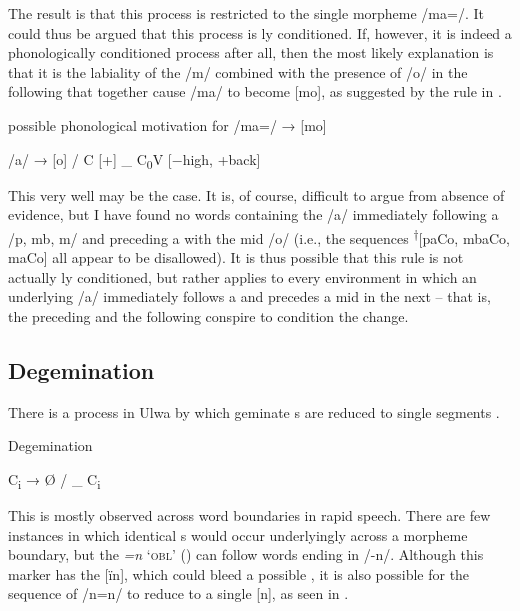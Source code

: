 The result is that this process is restricted to the single morpheme /ma=/. It could thus be argued that this process is ly conditioned. If, however, it is indeed a phonologically conditioned process after all, then the most likely explanation is that it is the labiality of the /m/ combined with the presence of /o/ in the following  that together cause /ma/ to become [mo], as suggested by the rule in .

\ea%
    \label{ex:phon:86}
          possible phonological motivation for /ma=/ → [mo]

    /a/ → [o] / C [+] \_ C\textsubscript{0}V [$-$high, +back]
\z

This very well may be the case. It is, of course, difficult to argue from absence of evidence, but I have found no words containing the  /a/ immediately following a   /p, mb, m/ and preceding a  with the mid  /o/ (i.e., the sequences \textsuperscript{†}[paCo, mbaCo, maCo] all appear to be disallowed). It is thus possible that this rule is not actually ly conditioned, but rather applies to every environment in which an underlying /a/ immediately follows a   and precedes a mid  in the next  – that is, the preceding  and the following   conspire to condition the change.


\subsection{Degemination}\label{sec:2.5.8}


There is a process in Ulwa by which geminate s are reduced to single segments .

\ea%
    \label{ex:phon:87}
          Degemination

    C\textsubscript{i} → Ø / \_ C\textsubscript{i}
\z

This is mostly observed across word boundaries in rapid speech. There are few instances in which identical s would occur underlyingly across a morpheme boundary, but the  \textit{=n} ‘\textsc{obl}’ () can follow words ending in /-n/. Although this marker has the  [ïn], which could bleed a possible , it is also possible for the sequence of /n=n/ to reduce to a single [n], as seen in .

